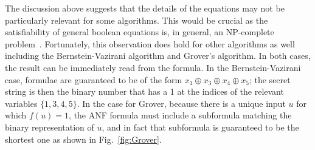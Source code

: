 \documentclass{article}
\begin{document}
\begin{refsection}
The discussion above suggests that the details of the equations may
not be particularly relevant for some algorithms. This would be
crucial as the satisfiability of general boolean equations is, in
general, an NP-complete
problem~\cite{4640789,Karp1972,10.1145/800157.805047}. Fortunately,
this observation does hold for other algorithms as well including the
Bernstein-Vazirani algorithm and Grover's algorithm. In both cases,
the result can be immediately read from the formula. In the
Bernstein-Vazirani case, formulae are guaranteed to be of the form
$x_1 \oplus x_3 \oplus x_4 \oplus x_5$; the secret string is then the
binary number that has a 1 at the indices of the relevant variables
$\{ 1,3,4,5 \}$. In the case for Grover, because there is a unique
input $u$ for which $f(u) = 1$, the ANF formula must include a
subformula matching the binary representation of $u$, and in fact that
subformula is guaranteed to be the shortest one as shown in
Fig.~\ref{fig:Grover}.


\end{refsection}
\end{document}
